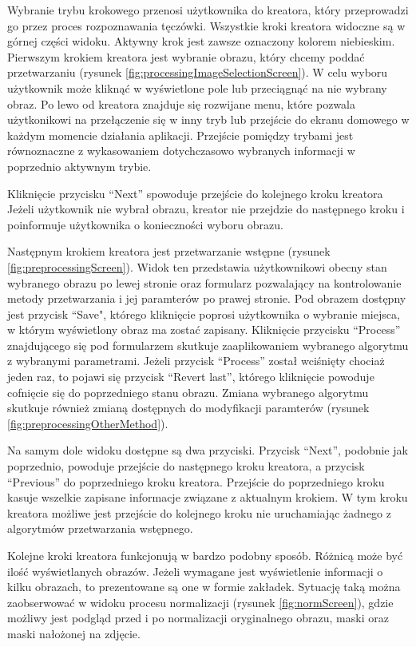Wybranie trybu krokowego przenosi użytkownika do kreatora, który przeprowadzi go przez proces
rozpoznawania tęczówki. Wszystkie kroki kreatora widoczne są w górnej części widoku. Aktywny krok
jest zawsze oznaczony kolorem niebieskim. Pierwszym krokiem kreatora jest wybranie obrazu, który chcemy
podda\'c przetwarzaniu (rysunek \ref{fig:processingImageSelectionScreen}). W celu wyboru użytkownik może klikną\'c w wyświetlone pole lub
przeciągną\'c na nie wybrany obraz. Po lewo od kreatora znajduje się rozwijane menu, które
pozwala użytkonikowi na przełączenie się w inny tryb lub przejście do ekranu domowego w każdym
momencie działania aplikacji. Przejście pomiędzy trybami jest równoznaczne z wykasowaniem
dotychczasowo wybranych informacji w poprzednio aktywnym trybie.

Kliknięcie przycisku ``Next'' spowoduje przejście do kolejnego kroku kreatora Jeżeli użytkownik
nie wybrał obrazu, kreator nie przejdzie do następnego kroku i poinformuje użytkownika o konieczności
wyboru obrazu.\newline

Następnym krokiem kreatora jest przetwarzanie wstępne (rysunek \ref{fig:preprocessingScreen}). Widok ten
przedstawia użytkownikowi obecny stan wybranego obrazu po lewej stronie oraz formularz pozwalający
na kontrolowanie metody przetwarzania i jej paramterów po prawej stronie. Pod obrazem dostępny jest
przycisk ``Save", którego kliknięcie poprosi użytkownika o wybranie miejsca, w którym wyświetlony obraz
ma zosta\'c zapisany. Kliknięcie przycisku ``Process'' znajdującego się pod formularzem skutkuje
zaaplikowaniem wybranego algorytmu z wybranymi parametrami. Jeżeli przycisk ``Process'' został wciśnięty
chociaż jeden raz, to pojawi się przycisk ``Revert last'', którego kliknięcie powoduje cofnięcie się
do poprzedniego stanu obrazu. Zmiana wybranego algorytmu skutkuje również zmianą dostępnych
do modyfikacji paramterów (rysunek \ref{fig:preprocessingOtherMethod}).

Na samym dole widoku dostępne są dwa przyciski. Przycisk ``Next'', podobnie
jak poprzednio, powoduje przejście do następnego kroku kreatora, a przycisk ``Previous'' do poprzedniego
kroku kreatora. Przejście do poprzedniego kroku kasuje wszelkie zapisane informacje związane z aktualnym
krokiem. W tym kroku kreatora możliwe jest przejście do kolejnego kroku nie uruchamiając żadnego z
algorytmów przetwarzania wstępnego.\newline

Kolejne kroki kreatora funkcjonują w bardzo podobny sposób. Różnicą może by\'c iloś\'c wyświetlanych
obrazów. Jeżeli wymagane jest wyświetlenie informacji o kilku obrazach, to prezentowane są one w formie
zakładek. Sytuację taką można zaobserwowa\'c w widoku procesu normalizacji (rysunek \ref{fig:normScreen}),
gdzie możliwy jest podgląd przed i po normalizacji oryginalnego obrazu, maski oraz maski nałożonej na
zdjęcie.\newline

